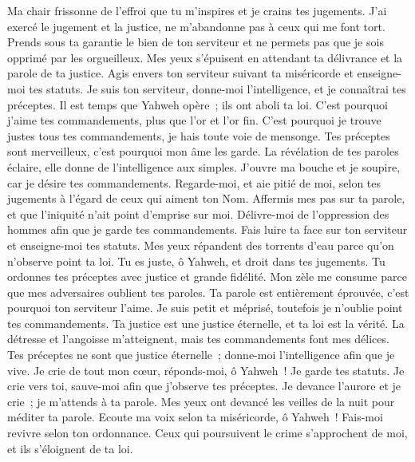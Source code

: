 \begin{multicols}{2}
Ma chair frissonne de l'effroi que tu m'inspires et je crains tes jugements.
 J'ai exercé le jugement et la justice, ne m'abandonne pas à ceux qui me font tort.
Prends sous ta garantie le bien de ton serviteur et ne permets pas que je sois opprimé par les orgueilleux.
Mes yeux s'épuisent en attendant ta délivrance et la parole de ta justice.
Agis envers ton serviteur suivant ta miséricorde et enseigne-moi tes statuts.
Je suis ton serviteur, donne-moi l'intelligence, et je connaîtrai tes préceptes.
Il est temps que Yahweh opère~; ils ont aboli ta loi.
C'est pourquoi j'aime tes commandements, plus que l'or et l'or fin.
C'est pourquoi je trouve justes tous tes commandements, je hais toute voie de mensonge.
 Tes préceptes sont merveilleux, c'est pourquoi mon âme les garde.
La révélation de tes paroles éclaire, elle donne de l'intelligence aux simples.
J'ouvre ma bouche et je soupire, car je désire tes commandements.
Regarde-moi, et aie pitié de moi, selon tes jugements à l'égard de ceux qui aiment ton Nom.
Affermis mes pas sur ta parole, et que l'iniquité n'ait point d'emprise sur moi.
Délivre-moi de l'oppression des hommes afin que je garde tes commandements.
Fais luire ta face sur ton serviteur et enseigne-moi tes statuts.
Mes yeux répandent des torrents d'eau parce qu'on n'observe point ta loi.
 Tu es juste, ô Yahweh, et droit dans tes jugements.
Tu ordonnes tes préceptes avec justice et grande fidélité.
Mon zèle me consume parce que mes adversaires oublient tes paroles.
Ta parole est entièrement éprouvée, c'est pourquoi ton serviteur l'aime.
Je suis petit et méprisé, toutefois je n'oublie point tes commandements.
Ta justice est une justice éternelle, et ta loi est la vérité.
La détresse et l'angoisse m'atteignent, mais tes commandements font mes délices.
Tes préceptes ne sont que justice éternelle~; donne-moi l'intelligence afin que je vive.
 Je crie de tout mon cœur, réponds-moi, ô Yahweh~! Je garde tes statuts.
Je crie vers toi, sauve-moi afin que j'observe tes préceptes.
Je devance l'aurore et je crie~; je m'attends à ta parole.
Mes yeux ont devancé les veilles de la nuit pour méditer ta parole.
Ecoute ma voix selon ta miséricorde, ô Yahweh~! Fais-moi revivre selon ton ordonnance.
Ceux qui poursuivent le crime s'approchent de moi, et ils s'éloignent de ta loi.

\end{multicols}
